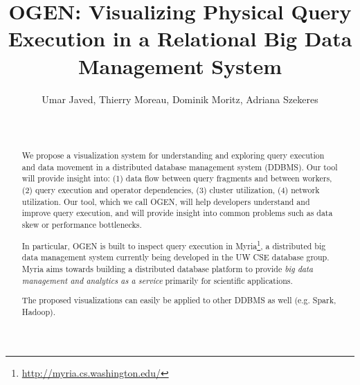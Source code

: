 \documentclass{chi2009}
\newcommand*{\system}{OGEN\xspace}
\newcommand*{\papertitle}{\system: Visualizing Physical Query Execution in a Relational Big Data Management System}
\begin{document}
\setlength{\paperheight}{11in}
\setlength{\paperwidth}{8.5in}
\setlength{\pdfpageheight}{\paperheight}
\setlength{\pdfpagewidth}{\paperwidth}

\toappear{}

\title{\papertitle}
\author{\alignauthor Umar Javed, Thierry Moreau, Dominik Moritz, Adriana Szekeres \\
 \\  \\
}

\maketitle

\begin{abstract}

We propose a visualization system for understanding and exploring query execution and data movement in a distributed database management system (DDBMS). Our tool will provide insight into: (1) data flow between query fragments and between workers, (2) query execution and operator dependencies, (3) cluster utilization, (4) network utilization. Our tool, which we call \system, will help developers understand and improve query execution, and will provide insight into common problems such as data skew or performance bottlenecks.

In particular, \system is built to inspect query execution in Myria\footnote{\url{http://myria.cs.washington.edu/}}, a distributed big data management system currently being developed in the UW CSE database group. Myria aims towards building a distributed database platform to provide \emph{big data management and analytics as a service} primarily for scientific applications.

The proposed visualizations can easily be applied to other DDBMS as well (e.g. Spark, Hadoop).

\end{abstract}


\end{document}
